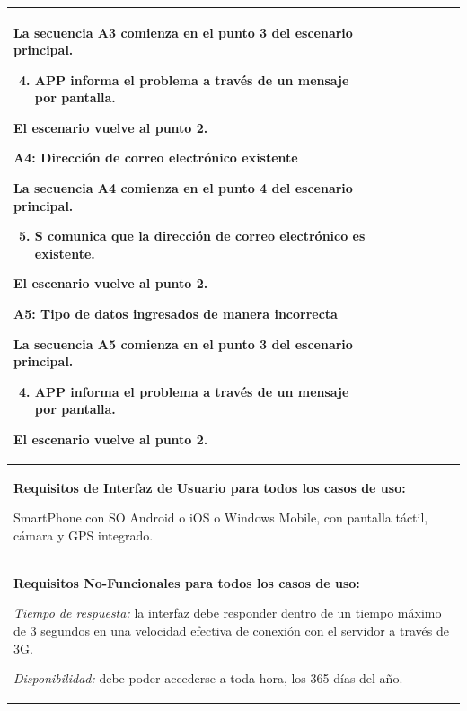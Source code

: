 \begin{longtable}{|l|p{5.5cm}|l|p{2cm}|l|p{1.9cm}|}
{    La secuencia A3 comienza en el punto 3 del escenario principal.
    \begin{enumerate}
        \setcounter{enumi}{3}
        \item APP informa el problema a través de un mensaje por pantalla.
    \end{enumerate}

    El escenario vuelve al punto 2.

    \textbf{A4: Dirección de correo electrónico existente}
    
    La secuencia A4 comienza en el punto 4 del escenario principal.
    \begin{enumerate}
        \setcounter{enumi}{4}
        \item S comunica que la dirección de correo electrónico es existente.
    \end{enumerate}

    El escenario vuelve al punto 2.

    \textbf{A5: Tipo de datos ingresados de manera incorrecta}
    
    La secuencia A5 comienza en el punto 3 del escenario principal.
    \begin{enumerate}
        \setcounter{enumi}{3}
        \item APP informa el problema a través de un mensaje por pantalla.
    \end{enumerate}

    El escenario vuelve al punto 2.

    } \\ \hline

    \multicolumn{6}{|p{15cm}|}{ \textbf{Requisitos de Interfaz de Usuario para todos los casos de uso: }

    SmartPhone con SO Android o iOS o Windows Mobile, con pantalla táctil, cámara y GPS integrado.
    
    } \\ \hline

    \multicolumn{6}{|p{15cm}|}{ \textbf{Requisitos No-Funcionales para todos los casos de uso: }

    \emph{Tiempo de respuesta:} la interfaz debe responder dentro de un tiempo máximo de 3 segundos en una velocidad efectiva de conexión con el servidor a través de 3G.

    \emph{Disponibilidad:} debe poder accederse a toda hora, los 365 días del año.

    } \\ \hline

\end{longtable}



